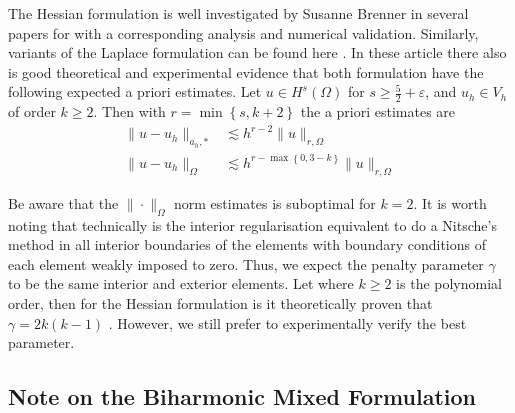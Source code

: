 The Hessian formulation is well investigated by Susanne Brenner in several papers for \cite{brenner2012, brenner2012quadratic, brenner2012quadratic_kirk} with a corresponding analysis and numerical validation. Similarly, variants of the Laplace formulation can be found here
\cite{feng2007fully, georgoulis2009discontinuous}. In these article there also is good theoretical and experimental evidence that both formulation have the following expected a priori estimates. Let  $u \in H^{s}( \Omega ) $ for $s\ge  \frac{5}{2} + \varepsilon$, and $u_{h}\in
V_{h}  $ of order $k\ge 2$. Then with $r = \min\left\{ s,
k+2 \right\}$ the a priori estimates are   \[
    \begin{split}
\| u - u_{h} \|_{ a_{h},*  }^{  }  & \lesssim  h^{r-2} \| u \|_{ r, \Omega  }^{  } \\
\| u - u_{h} \|_{ \Omega   }^{  }  & \lesssim  h^{r- \max_{}\left\{ 0, 3-k \right\}  } \| u \|_{ r,\Omega  }^{  }
    \end{split}
\]

Be aware that the $\| \cdot  \|_{\Omega   }^{  } $ norm estimates is suboptimal for $k=2$.
It is worth noting that technically is the interior regularisation equivalent to do a Nitsche's method in all interior boundaries of the elements with boundary conditions of each element weakly
imposed to zero. Thus, we expect the penalty parameter $\gamma$ to be the same interior and exterior elements. Let where $k\ge 2$ is the polynomial order, then for the Hessian formulation is it theoretically proven that $\gamma = 2k ( k-1 ) $
\cite{brenner2012quadratic, brenner2012}. However, we still prefer to experimentally verify the best parameter.


\subsection{Note on the Biharmonic Mixed Formulation}%
\label{subsec:biharmonic_mixed_formulation}

